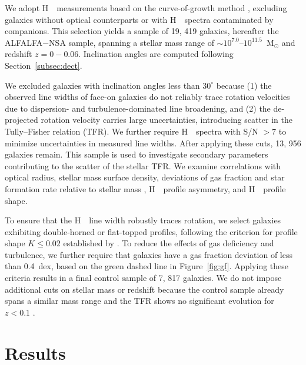 \documentclass[twocolumn]{aastex631}
\def\HI{H\,  {\textsc{\romannumeral 1}}}
\begin{document}
We adopt \HI\ measurements based on the curve-of-growth method \citep{Yu2022ApJS..261...21Y}, excluding galaxies without optical counterparts or with \HI\ spectra contaminated by companions. This selection yields a sample of 19,  419 galaxies, hereafter the ALFALFA$-$NSA sample, spanning a stellar mass range of $\sim10^{7.0}$--$10^{11.5}$~M$_\odot$ and redshift $z=0-$0.06. Inclination angles are computed following Section~\ref{subsec:dect}.

We excluded galaxies with inclination angles less than $30^\circ$ because (1) the observed line widths of face-on galaxies do not reliably trace rotation velocities due to dispersion- and turbulence-dominated line broadening, and (2) the de-projected rotation velocity carries large uncertainties, introducing scatter in the Tully--Fisher relation (TFR). We further require \HI\ spectra with S/N $>7$ to minimize uncertainties in measured line widths. After applying these cuts, 13,  956 galaxies remain. This sample is used to investigate secondary parameters contributing to the scatter of the stellar TFR. We examine correlations with optical radius, stellar mass surface density, deviations of gas fraction and star formation rate relative to stellar mass \citep{Catinella2018MNRAS.476..875C}, \HI\ profile asymmetry, and \HI\ profile shape. 

To ensure that the \HI\ line width robustly traces rotation, we select galaxies exhibiting double-horned or flat-topped profiles, following the criterion for profile shape $K \le 0.02$ established by \citet{Yu2022ApJS..261...21Y}. To reduce the effects of gas deficiency and turbulence, we further require that galaxies have a gas fraction deviation of less than 0.4~dex, based on the green dashed line in Figure~\ref{fig:gf}. Applying these criteria results in a final control sample of 7,  817 galaxies. We do not impose additional cuts on stellar mass or redshift because the control sample already spans a similar mass range and the TFR shows no significant evolution for $z<0.1$ \citep{Portinari2007MNRAS.375..913P}.


\section{Results}
\label{sec:sf-gas}
\end{document}
